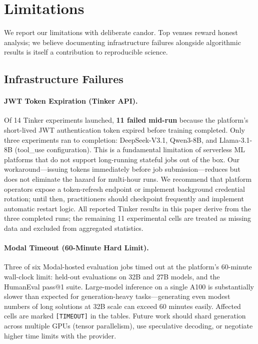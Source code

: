 \section{Limitations}
\label{sec:limitations}

We report our limitations with deliberate candor. Top venues reward honest
analysis; we believe documenting infrastructure failures alongside algorithmic
results is itself a contribution to reproducible science.

\subsection{Infrastructure Failures}
\label{sec:infra_failures}

\paragraph{JWT Token Expiration (Tinker API).}
Of 14 Tinker experiments launched, \textbf{11 failed mid-run} because the
platform's short-lived JWT authentication token expired before training
completed. Only three experiments ran to completion: DeepSeek-V3.1,
Qwen3-8B, and Llama-3.1-8B (tool\_use configuration). This is a fundamental
limitation of serverless ML platforms that do not support long-running
stateful jobs out of the box. Our workaround---issuing tokens immediately
before job submission---reduces but does not eliminate the hazard for
multi-hour runs. We recommend that platform operators expose a token-refresh
endpoint or implement background credential rotation; until then, practitioners
should checkpoint frequently and implement automatic restart logic. All
reported Tinker results in this paper derive from the three completed runs;
the remaining 11 experimental cells are treated as missing data and excluded
from aggregated statistics.

\paragraph{Modal Timeout (60-Minute Hard Limit).}
Three of six Modal-hosted evaluation jobs timed out at the platform's
60-minute wall-clock limit: held-out evaluations on 32B and 27B models, and
the HumanEval pass@1 suite. Large-model inference on a single A100 is
substantially slower than expected for generation-heavy tasks---generating
even modest numbers of long solutions at 32B scale can exceed 60 minutes
easily. Affected cells are marked \texttt{[TIMEOUT]} in the tables.
Future work should shard generation across multiple GPUs (tensor parallelism),
use speculative decoding, or negotiate higher time limits with the provider.


